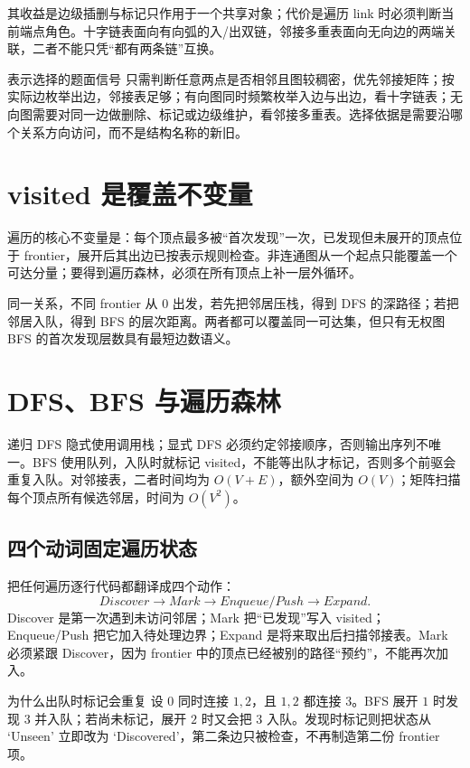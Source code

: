 \documentclass[UTF8,fontset=none,11pt,a4paper]{ctexart}
\begin{document}
其收益是边级插删与标记只作用于一个共享对象；代价是遍历 link 时必须判断当前端点角色。十字链表面向有向弧的入/出双链，邻接多重表面向无向边的两端关联，二者不能只凭“都有两条链”互换。

\begin{methodbox}{表示选择的题面信号}
只需判断任意两点是否相邻且图较稠密，优先邻接矩阵；按实际边枚举出边，邻接表足够；有向图同时频繁枚举入边与出边，看十字链表；无向图需要对同一边做删除、标记或边级维护，看邻接多重表。选择依据是需要沿哪个关系方向访问，而不是结构名称的新旧。
\end{methodbox}

\section{visited 是覆盖不变量}
遍历的核心不变量是：每个顶点最多被“首次发现”一次，已发现但未展开的顶点位于 frontier，展开后其出边已按表示规则检查。非连通图从一个起点只能覆盖一个可达分量；要得到遍历森林，必须在所有顶点上补一层外循环。
\begin{examplebox}{同一关系，不同 frontier}
从 $0$ 出发，若先把邻居压栈，得到 DFS 的深路径；若把邻居入队，得到 BFS 的层次距离。两者都可以覆盖同一可达集，但只有无权图 BFS 的首次发现层数具有最短边数语义。
\end{examplebox}

\section{DFS、BFS 与遍历森林}
递归 DFS 隐式使用调用栈；显式 DFS 必须约定邻接顺序，否则输出序列不唯一。BFS 使用队列，入队时就标记 visited，不能等出队才标记，否则多个前驱会重复入队。对邻接表，二者时间均为 $O(V+E)$，额外空间为 $O(V)$；矩阵扫描每个顶点所有候选邻居，时间为 $O(V^2)$。

\subsection{四个动词固定遍历状态}
把任何遍历逐行代码都翻译成四个动作：
\[
\boxed{Discover\to Mark\to Enqueue/Push\to Expand}.
\]
Discover 是第一次遇到未访问邻居；Mark 把“已发现”写入 visited；Enqueue/Push 把它加入待处理边界；Expand 是将来取出后扫描邻接表。Mark 必须紧跟 Discover，因为 frontier 中的顶点已经被别的路径“预约”，不能再次加入。

\begin{examplebox}{为什么出队时标记会重复}
设 $0$ 同时连接 $1,2$，且 $1,2$ 都连接 $3$。BFS 展开 $1$ 时发现 $3$ 并入队；若尚未标记，展开 $2$ 时又会把 $3$ 入队。发现时标记则把状态从 `Unseen' 立即改为 `Discovered'，第二条边只被检查，不再制造第二份 frontier 项。
\end{examplebox}
\end{document}
